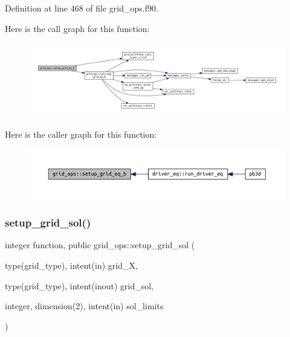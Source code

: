 Definition at line 468 of file grid\+\_\+ops.\+f90.

Here is the call graph for this function\+:
\nopagebreak
\begin{figure}[H]
\begin{center}
\leavevmode
\includegraphics[width=350pt]{namespacegrid__ops_ad16495ddd320562451c2325bafecf2d8_cgraph}
\end{center}
\end{figure}
Here is the caller graph for this function\+:
\nopagebreak
\begin{figure}[H]
\begin{center}
\leavevmode
\includegraphics[width=350pt]{namespacegrid__ops_ad16495ddd320562451c2325bafecf2d8_icgraph}
\end{center}
\end{figure}
\mbox{\label{namespacegrid__ops_ae4f50f7b63e0a8b84dae6b98fd3e5d71}} 
\subsubsection{\texorpdfstring{setup\+\_\+grid\+\_\+sol()}{setup\_grid\_sol()}}
{\footnotesize\ttfamily integer function, public grid\+\_\+ops\+::setup\+\_\+grid\+\_\+sol (\begin{DoxyParamCaption}\item[{type(grid\+\_\+type), intent(in)}]{grid\+\_\+X,  }\item[{type(grid\+\_\+type), intent(inout)}]{grid\+\_\+sol,  }\item[{integer, dimension(2), intent(in)}]{sol\+\_\+limits }\end{DoxyParamCaption})}



